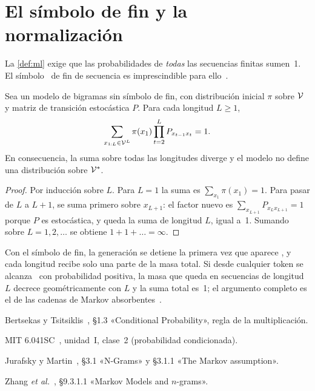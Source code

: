 \section{El símbolo de fin y la normalización}

La \cref{def:ml} exige que las probabilidades de \emph{todas} las secuencias finitas sumen~1. El símbolo \fin\ de fin de secuencia es imprescindible para ello~\cite[§3.1, ejercicio 3.5]{jm3}.

\begin{proposicion}\label{prop:longitud-fija}
Sea un modelo de bigramas sin símbolo de fin, con distribución inicial $\pi$ sobre $\mathcal{V}$ y matriz de transición estocástica $P$. Para cada longitud $L\ge 1$,
\[
\sum_{x_{1:L}\in\mathcal{V}^{L}}\pi(x_1)\prod_{t=2}^{L}P_{x_{t-1}x_t}=1.
\]
En consecuencia, la suma sobre todas las longitudes diverge y el modelo no define una distribución sobre $\mathcal{V}^{*}$.
\end{proposicion}

\begin{proof}
Por inducción sobre $L$. Para $L=1$ la suma es $\sum_{x_1}\pi(x_1)=1$. Para pasar de $L$ a $L+1$, se suma primero sobre $x_{L+1}$: el factor nuevo es $\sum_{x_{L+1}}P_{x_Lx_{L+1}}=1$ porque $P$ es estocástica, y queda la suma de longitud $L$, igual a~1. Sumando sobre $L=1,2,\dots$ se obtiene $1+1+\dots=\infty$.
\end{proof}

\begin{observacion}
Con el símbolo de fin, la generación se detiene la primera vez que aparece \fin, y cada longitud recibe solo una parte de la masa total. Si desde cualquier token se alcanza \fin\ con probabilidad positiva, la masa que queda en secuencias de longitud $L$ decrece geométricamente con $L$ y la suma total es~1; el argumento completo es el de las cadenas de Markov absorbentes~\cite[cap.~7]{bt}.
\end{observacion}

\begin{lecturas}
\item Bertsekas y Tsitsiklis~\cite{bt}, §1.3 «Conditional Probability», regla de la multiplicación.
\item MIT 6.041SC~\cite{mit6041}, unidad~I, clase~2 (probabilidad condicionada).
\item Jurafsky y Martin~\cite{jm3}, §3.1 «N-Grams» y §3.1.1 «The Markov assumption».
\item Zhang \emph{et al.}~\cite{d2l}, §9.3.1.1 «Markov Models and $n$-grams».
\end{lecturas}

